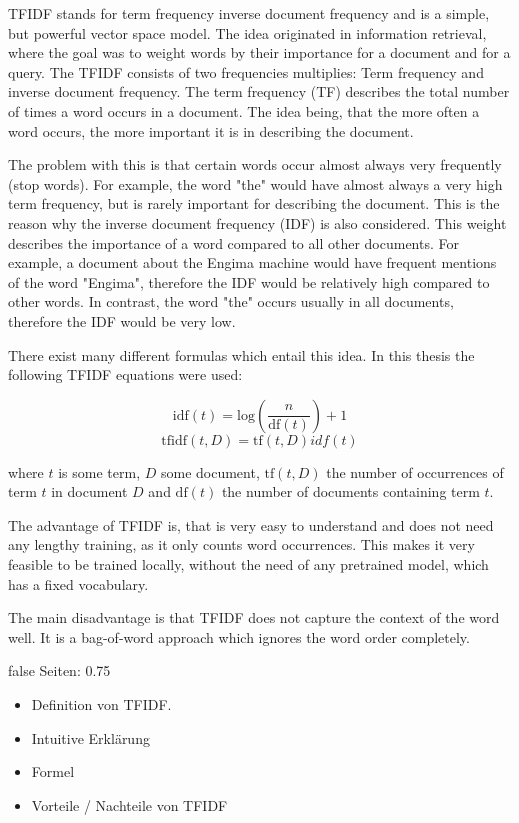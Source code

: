 \documentclass[draft,final,oneside]{vutinfth} %
\begin{document}
TFIDF stands for term frequency inverse document frequency and is a simple, but powerful vector space model. The idea originated in information retrieval, where the goal was to weight words by their importance for a document and for a query. The TFIDF consists of two frequencies multiplies: Term frequency and inverse document frequency. The term frequency (TF) describes the total number of times a word occurs in a document. The idea being, that the more often a word occurs, the more important it is in describing the document.

The problem with this is that certain words occur almost always very frequently (stop words). For example, the word "the" would have almost always a very high term frequency, but is rarely important for describing the document. This is the reason why the inverse document frequency (IDF) is also considered. This weight describes the importance of a word compared to all other documents. For example, a document about the Engima machine would have frequent mentions of the word "Engima", therefore the IDF would be relatively high compared to other words. In contrast, the word "the" occurs usually in all documents, therefore the IDF would be very low.

There exist many different formulas which entail this idea. In this thesis the following TFIDF equations were used:

\begin{equation}
\text{idf}(t) = \text{log} \left(\dfrac{n}{\text{df}(t)} \right) + 1
\end{equation}
\begin{equation}
\text{tfidf}(t, D) = \text{tf}(t, D)idf(t)
\end{equation}


where $t$ is some term, $D$ some document, $\text{tf}(t, D)$ the number of occurrences of term $t$ in document $D$ and $\text{df}(t)$ the number of documents containing term $t$.

The advantage of TFIDF is, that is very easy to understand and does not need any lengthy training, as it only counts word occurrences. This makes it very feasible to be trained locally, without the need of any pretrained model, which has a fixed vocabulary.

The main disadvantage is that TFIDF does not capture the context of the word well. It is a bag-of-word approach which ignores the word order completely.

\if false
Seiten: 0.75

\begin{itemize}
\item Definition von TFIDF. 
\item Intuitive Erklärung
\item Formel
\item Vorteile / Nachteile von TFIDF
\end{itemize}
\end{document}
